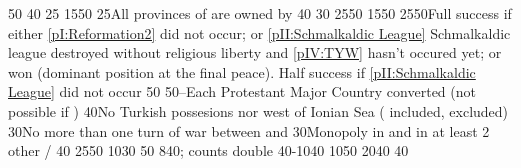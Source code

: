 %
 
%
%
{}{50}{\EU@objNoFrenchVassal}%
%
%
{}{40}{\EU@objNoFrenchItaly}%
%
%
{}{25}{\EU@objSDCF}%
%
%
{15}{50}{\EU@objPresidiosHIS}%
%
%
{}{25}{All provinces of \paysprovincesne are owned by \paysmajeurEspagne}%
%
%
%
{}{40}{\EU@objNoFrenchVassal}%
%
%
{}{30}{\EU@objNoFrenchItaly}%
%
%
{25}{50}{}%
%
%
{15}{50}{\EU@objPresidiosHIS}%
%
%
{25}{50}{Full success if either \ref{pI:Reformation2} did not occur; or
  \ref{pII:Schmalkaldic League} Schmalkaldic league destroyed without
  religious liberty and \ref{pIV:TYW} hasn't occured yet; or
   won (dominant position at the final peace). Half success
  if \ref{pII:Schmalkaldic League} did not occur}%
%
%
%
{}{50}{\EU@objHalfHungary}%
%
%
{50}{--}{Each Protestant Major Country converted (not possible if \CATHCO)}%
%
%
{}{40}{No Turkish possesions nor \VASSAL west of Ionian Sea
  ( included, \paystripoli excluded)}%
%
%
{}{30}{No more than one turn of war between  and
  }%
%
%
{}{30}{Monopoly in  and in at least 2 other \CTZ/\STZ}%
%
%
%
{}{40}{\EU@objHalfHungary}%
%
%
{25}{50}{\EU@objGermanEmpire}
%
%
{10}{30}{\EU@objBigAustria}%
%
%
{}{50}{\EU@objPortugalAnnexed}%
%
%
{8}{40}{\EU@objMonopolyZone;  counts double}%
%
%
%
{40-10}{40}{}%
%
%
{10}{50}{\EU@objSpanishNetherlands}%
%
%
{20}{40}{\EU@objSpanishWorld}%
%
%
{}{40}{\EU@objPortugalAnnexed}%
